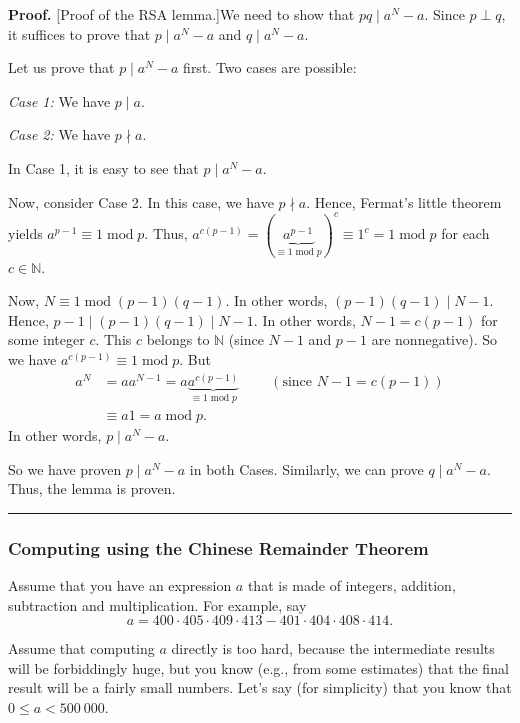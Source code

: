 \documentclass[numbers=enddot,12pt,final,onecolumn,notitlepage]{scrartcl}%
\numberwithin{exer}{subsection}
\theoremstyle{definition}
\newenvironment{proof}[1][Proof]{\noindent\textbf{#1.} }{\ \rule{0.5em}{0.5em}}
\begin{document}
\begin{proof}
[Proof of the RSA lemma.]We need to show that $pq\mid a^{N}-a$. Since $p\perp
q$, it suffices to prove that $p\mid a^{N}-a$ and $q\mid a^{N}-a$.

Let us prove that $p\mid a^{N}-a$ first. Two cases are possible:

\textit{Case 1:} We have $p\mid a$.

\textit{Case 2:} We have $p\nmid a$.

In Case 1, it is easy to see that $p\mid a^{N}-a$.

Now, consider Case 2. In this case, we have $p\nmid a$. Hence, Fermat's little
theorem yields $a^{p-1}\equiv1\operatorname{mod}p$. Thus, $a^{c\left(
p-1\right)  }=\left(  \underbrace{a^{p-1}}_{\equiv1\operatorname{mod}%
p}\right)  ^{c}\equiv1^{c}=1\operatorname{mod}p$ for each $c\in\mathbb{N}$.

Now, $N\equiv1\operatorname{mod}\left(  p-1\right)  \left(  q-1\right)  $. In
other words, $\left(  p-1\right)  \left(  q-1\right)  \mid N-1$. Hence,
$p-1\mid\left(  p-1\right)  \left(  q-1\right)  \mid N-1$. In other words,
$N-1=c\left(  p-1\right)  $ for some integer $c$. This $c$ belongs to
$\mathbb{N}$ (since $N-1$ and $p-1$ are nonnegative). So we have $a^{c\left(
p-1\right)  }\equiv1\operatorname{mod}p$. But
\begin{align*}
a^{N}  &  =aa^{N-1}=a\underbrace{a^{c\left(  p-1\right)  }}_{\equiv
1\operatorname{mod}p}\ \ \ \ \ \ \ \ \ \ \left(  \text{since }N-1=c\left(
p-1\right)  \right) \\
&  \equiv a1=a\operatorname{mod}p.
\end{align*}
In other words, $p\mid a^{N}-a$.

So we have proven $p\mid a^{N}-a$ in both Cases. Similarly, we can prove
$q\mid a^{N}-a$. Thus, the lemma is proven.
\end{proof}

\subsubsection{Computing using the Chinese Remainder Theorem}

Assume that you have an expression $a$ that is made of integers, addition,
subtraction and multiplication. For example, say%
\[
a=400\cdot405\cdot409\cdot413-401\cdot404\cdot408\cdot414.
\]


Assume that computing $a$ directly is too hard, because the intermediate
results will be forbiddingly huge, but you know (e.g., from some estimates)
that the final result will be a fairly small numbers. Let's say (for
simplicity) that you know that $0\leq a<500\ 000$.
\end{document}
